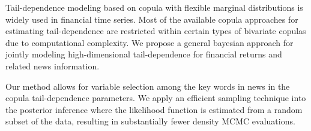 \documentclass[a0paper,portrait,fontscale = 0.39,margin=2.5em]{baposter/baposter}
\begin{document}
\begin{poster}
  {

    {Tail-dependence modeling based on copula with flexible marginal distributions is
      widely used in financial time series. Most of the available copula approaches for
      estimating tail-dependence are restricted within certain types of bivariate copulas
      due to computational complexity. We propose a general bayesian approach for jointly
      modeling high-dimensional tail-dependence for financial returns and related news
      information.  \vspace{0.3cm}

      Our method allows for variable selection among the key words in news in the copula
      tail-dependence parameters. We apply an efficient sampling technique into the
      posterior inference where the likelihood function is estimated from a random subset
      of the data, resulting in substantially fewer density MCMC evaluations.  }

  }



\end{poster}
\end{document}
